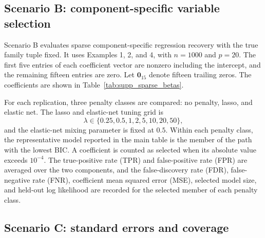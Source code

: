 \documentclass{article}
\begin{document}
\subsection{Scenario B: component-specific variable selection}

Scenario B evaluates sparse component-specific regression recovery with the
true family tuple fixed.  It uses Examples 1, 2, and 4, with \(n=1000\) and
\(p=20\).  The first five entries of each coefficient vector are nonzero
including the intercept, and the remaining fifteen entries are zero.  Let
\(\mathbf 0_{15}\) denote fifteen trailing zeros.  The coefficients are shown
in Table~\ref{tab:supp_sparse_betas}.

\begin{table}[htbp]
\centering
\caption{Sparse coefficient vectors used in Scenario B.}
\label{tab:supp_sparse_betas}
\end{table}

For each replication, three penalty classes are compared: no penalty, lasso,
and elastic net.  The lasso and elastic-net tuning grid is
\[
    \lambda\in\{0.25,0.5,1,2,5,10,20,50\},
\]
and the elastic-net mixing parameter is fixed at \(0.5\).  Within each penalty
class, the representative model reported in the main table is the member of the
path with the lowest BIC.  A coefficient is counted as selected when its
absolute value exceeds \(10^{-4}\).  The true-positive rate (TPR) and
false-positive rate (FPR) are averaged over the two components, and the
false-discovery rate (FDR), false-negative rate (FNR), coefficient mean squared
error (MSE), selected model size, and held-out log likelihood are recorded for
the selected member of each penalty class.

\subsection{Scenario C: standard errors and coverage}
\end{document}

